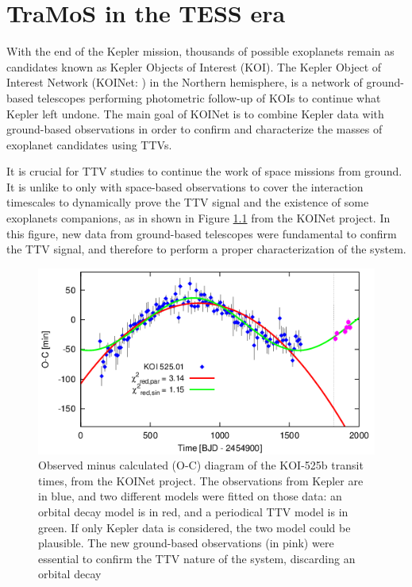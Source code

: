 \chapter{TraMoS in the TESS era}\label{chap:tess}

With the end of the Kepler mission, thousands of possible exoplanets remain as candidates known as Kepler Objects of Interest (KOI). The Kepler Object of Interest Network (KOINet: \citep{vonEssen2018,Freuddenthal2018}) in the Northern hemisphere, is a network of ground-based telescopes performing photometric follow-up of KOIs to continue what Kepler left undone. The main goal of KOINet is to combine Kepler data with ground-based observations in order to confirm and characterize the masses of exoplanet candidates using TTVs.

It is crucial for TTV studies to continue the work of space missions from ground. It is unlike to only with space-based observations to cover the interaction timescales to dynamically prove the TTV signal and the existence of some exoplanets companions, as in shown in Figure \ref{koinet} from the KOINet project. In this figure, new data from ground-based telescopes were fundamental to confirm the TTV signal, and therefore to perform a proper characterization of the system.

\begin{figure}
\centering
\includegraphics[width=0.8\columnwidth]{imagenes/koinet.png}
\caption{Observed minus calculated (O-C) diagram of the KOI-525b transit times, from the KOINet project. The observations from Kepler are in blue, and two different models were fitted on those data: an orbital decay model is in red, and a periodical TTV model is in green. If only Kepler data is considered, the two model could be plausible. The new ground-based observations (in pink) were essential to confirm the TTV nature of the system, discarding an orbital decay}
\label{koinet}
\end{figure}


